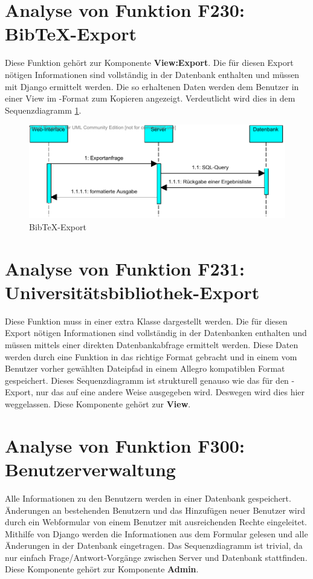 \section{Analyse von Funktion F230: Bib\TeX -Export}
Diese Funktion gehört zur Komponente \textbf{View:Export}. Die für diesen Export nötigen Informationen sind vollständig in der Datenbank enthalten und müssen mit Django ermittelt werden. Die so erhaltenen Daten werden dem Benutzer in einer View im \BibTeX -Format zum Kopieren angezeigt. Verdeutlicht wird dies in dem Sequenzdiagramm \ref{fig:BibTeX-Export}.

\begin{figure}[h]
\includegraphics[width=0.8\linewidth]{bilder/Seq-BibTex.pdf}
\caption[BibTeX-Export]{BibTeX-Export}
\label{fig:BibTeX-Export}
\end{figure}

\section{Analyse von Funktion F231: Universitätsbibliothek-Export}

Diese Funktion muss in einer extra Klasse dargestellt werden. Die für diesen Export nötigen Informationen sind vollständig in der Datenbanken enthalten und müssen mittels einer direkten Datenbankabfrage ermittelt werden. Diese Daten werden durch eine Funktion in das richtige Format gebracht und in einem vom Benutzer vorher gewählten Dateipfad in einem Allegro kompatiblen Format gespeichert. Dieses Sequenzdiagramm ist strukturell genauso wie das für den \BibTeX -Export, nur das auf eine andere Weise ausgegeben wird. Deswegen wird dies hier weggelassen. Diese Komponente gehört zur \textbf{View}.


\section{Analyse von Funktion F300: Benutzerverwaltung}
Alle Informationen zu den Benutzern werden in einer Datenbank gespeichert. Änderungen an bestehenden Benutzern und das Hinzufügen neuer Benutzer wird durch ein Webformular von einem Benutzer mit ausreichenden Rechte eingeleitet. Mithilfe von Django werden die Informationen aus dem Formular gelesen und alle Änderungen in der Datenbank eingetragen. Das Sequenzdiagramm ist trivial, da nur einfach Frage/Antwort-Vorgänge zwischen Server und Datenbank stattfinden. Diese Komponente gehört zur Komponente \textbf{Admin}.


